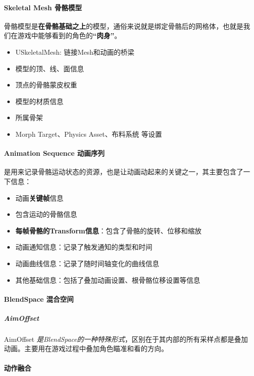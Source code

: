 \documentclass[UTF8,a4paper,12pt]{ctexbook}
\begin{document}
			\paragraph{Skeletal Mesh 骨骼模型}
				骨骼模型是\textbf{在骨骼基础之上}的模型，通俗来说就是绑定骨骼后的网格体，也就是我们在游戏中能够看到的角色的\textbf{“肉身”}。
				\begin{itemize}
					\item USkeletalMesh: 链接Mesh和动画的桥梁
					\item 模型的顶、线、面信息
					\item 顶点的骨骼蒙皮权重
					\item 模型的材质信息
					\item 所属骨架
					\item Morph Target、Physics Asset、布料系统 等设置
				\end{itemize}
			
			
			\paragraph{Animation Sequence 动画序列}
				是用来记录骨骼运动状态的资源，也是让动画动起来的关键之一，其主要包含了一下信息：
				
				\begin{itemize}
					\item 动画\textbf{关键帧}信息
					\item 包含运动的骨骼信息
					\item \textbf{每帧骨骼的Transform信息}：包含了骨骼的旋转、位移和缩放
					\item 动画通知信息：记录了触发通知的类型和时间
					\item 动画曲线信息：记录了随时间轴变化的曲线信息
					\item 其他基础信息：包括了叠加动画设置、根骨骼位移设置等信息
				\end{itemize}
			
			\paragraph{BlendSpace 混合空间}
				
					\subparagraph{AimOffset}
								AimOffset\textit{ 是BlendSpace的一种特殊形式}，区别在于其内部的所有采样点都是叠加动画。主要用在游戏过程中叠加角色瞄准和看的方向。
			
			\paragraph{动作融合}
			
\end{document}
